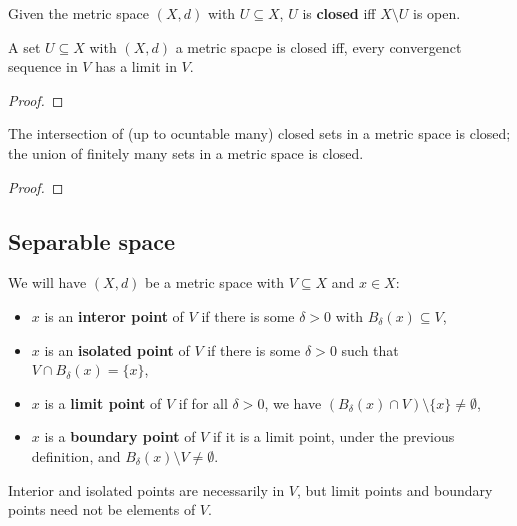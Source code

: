 \documentclass[../Year2.tex]{subfiles}
\begin{document}
\begin{definition}
    Given the metric space $(X,d)$ with $U\subseteq X$, $U$ is \textbf{closed} iff $X\setminus U$ is open.
\end{definition}

\begin{proposition}
    A set $U\subseteq X$ with $(X,d)$ a metric spacpe is closed iff, every convergenct sequence in $V$ has a limit in $V$.
    \begin{proof}
        
    \end{proof}
\end{proposition}

\begin{proposition}
    The intersection of (up to ocuntable many) closed sets in a metric space is closed; the union of finitely many sets in a metric space is closed.
    \begin{proof}
        
    \end{proof}
\end{proposition}

\subsection{Separable space}

\begin{definition}
    We will have $(X,d)$ be a metric space with $V\subseteq X$ and $x\in X$: \begin{itemize}
        \item $x$ is an \textbf{interor point} of $V$ if there is some $\delta>0$ with $B_\delta(x)\subseteq V$,
        \item $x$ is an \textbf{isolated point} of $V$ if there is some $\delta>0$ such that $V\cap B_\delta(x)=\{x\}$,
        \item $x$ is a \textbf{limit point} of $V$ if for all $\delta>0$, we have $(B_\delta(x)\cap V)\setminus\{x\}\neq\emptyset$, 
        \item $x$ is a \textbf{boundary point} of $V$ if it is  a limit point, under the previous definition, and $B_\delta(x)\setminus V\neq \emptyset$.
    \end{itemize}
\end{definition}

\begin{remark}
    Interior and isolated points are necessarily in $V$, but limit points and boundary points need not be elements of $V$.
\end{remark}
\end{document}
